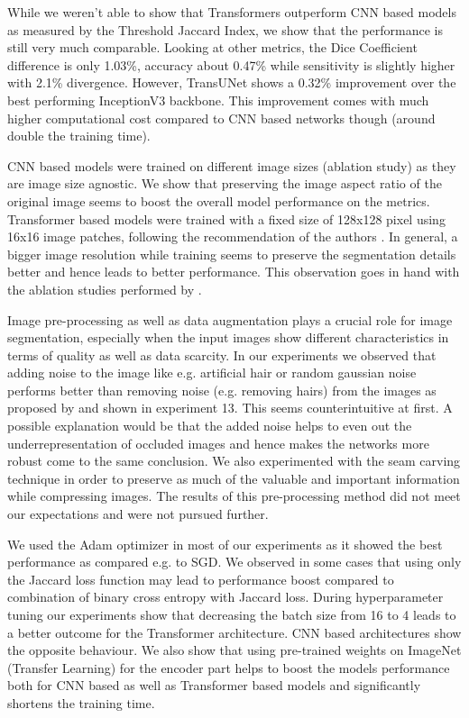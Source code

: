 \par
While we weren’t able to show that Transformers outperform CNN based models as measured by the Threshold Jaccard Index, we show that the performance is still very much comparable. Looking at other metrics, the Dice Coefficient difference is only 1.03\%, accuracy about 0.47\% while sensitivity is slightly higher with 2.1\% divergence. However, TransUNet shows a 0.32\% improvement over the best performing InceptionV3 backbone. This improvement comes with much higher computational cost compared to CNN based networks though (around double the training time).

\par
CNN based models were trained on different image sizes (ablation study) as they are image size agnostic. We show that preserving the image aspect ratio of the original image seems to boost the overall model performance on the metrics. Transformer based models were trained with a fixed size of 128x128 pixel using 16x16 image patches, following the recommendation of the authors \citep{transunet-2021-chen, medical_transformer-2021-valanarasu}. In general, a bigger image resolution while training seems to preserve the segmentation details better and hence leads to better performance. This observation goes in hand with the ablation studies performed by \citep{transunet-2021-chen}.

\par
Image pre-processing as well as data augmentation plays a crucial role for image segmentation, especially when the input images show different characteristics in terms of quality as well as data scarcity. In our experiments we observed that adding noise to the image like e.g. artificial hair or random gaussian noise performs better than removing noise (e.g. removing hairs) from the images as proposed by \citep{data_purification-2019-bisla} and shown in experiment 13. This seems counterintuitive at first. A possible explanation would be that the added noise helps to even out the underrepresentation of occluded images and hence makes the networks more robust \citep{skin_segmentation-2019-jahanifar} come to the same conclusion. We also experimented with the seam carving technique \citep{seam_carving-2007-shai} in order to preserve as much of the valuable and important information while compressing images. The results of this pre-processing method did not meet our expectations and were not pursued further.

\par
We used the Adam optimizer in most of our experiments as it showed the best performance as compared e.g. to SGD. We observed in some cases that using only the Jaccard loss function may lead to performance boost compared to combination of binary cross entropy with Jaccard loss. During hyperparameter tuning our experiments show that decreasing the batch size from 16 to 4 leads to a better outcome for the Transformer architecture. CNN based architectures show the opposite behaviour. We also show that using pre-trained weights on ImageNet (Transfer Learning) for the encoder part helps to boost the models performance both for CNN based as well as Transformer based models and significantly shortens the training time.


